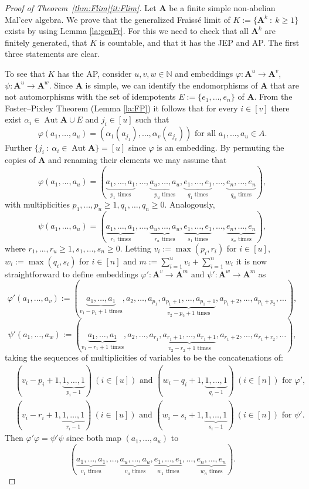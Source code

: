 \documentclass[12pt,a4paper,reqno]{amsart}
\numberwithin{equation}{section}
\theoremstyle{plain}
\theoremstyle{definition}
\newcommand{\A}{\mathbf{A}}
\newcommand{\N}{\mathbb{N}}
\DeclareMathOperator{\Aut}{Aut}
\newcommand{\st}{\: :\:}
\begin{document}
\begin{proof}[Proof of Theorem~\ref{thm:Flim}\eqref{it:Flim}]
 Let $\A$ be a finite simple non-abelian Mal'cev algebra. 
We prove that the generalized Fra{\"i}ss{\'e} limit of $K := \{\mathbf{A}^k \st {k\geq 1}\}$ exists by using 
Lemma \ref{la:genFr}. For this we need to check that all $\A^k$ are finitely generated, 
that $K$ is countable, and that it has the JEP and AP. The first three statements are clear.

 To see that $K$ has the AP, consider $u,v,w\in\N$ and embeddings $\varphi\colon \A^u\to\A^v$, $\psi\colon \A^u\to\A^w$.
 Since $\A$ is simple, we can identify the endomorphisms of $\A$ that are not automorphisms with the set of idempotents
 $E := \{e_1,\dots,e_n\}$ of $\A$. 
 From the Foster--Pixley Theorem (Lemma \ref{la:FP}) it follows that for every $i\in [v]$ there exist
 $\alpha_i\in\Aut\A \cup E$ and $j_i\in [u]$ such that
\[ \varphi(a_1,\dots,a_u) = (\alpha_1(a_{j_1}),\dots,\alpha_v(a_{j_v})) \text{ for all } a_1,\dots,a_u\in A. \]
 Further $\{j_i\st \alpha_i\in\Aut\A\} = [u]$ since $\varphi$ is an embedding.
By permuting the copies of $\A$ and renaming their elements we may assume that
\[ \varphi(a_1,\dots,a_u) = (\underbrace{a_1,\dots,a_1}_{p_1 \text{ times}},\dots,\underbrace{a_u,\dots,a_u}_{p_u \text{ times}},\underbrace{e_1,\dots,e_1}_{q_1 \text{ times}},\dots,\underbrace{e_n,\dots,e_n}_{q_n \text{ times}}), \]
 with multiplicities $p_1,\dots,p_u\geq 1, q_1,\dots,q_n\geq 0$.
Analogously,
\[ \psi(a_1,\dots,a_u) = (\underbrace{a_1,\dots,a_1}_{r_1 \text{ times}},\dots,\underbrace{a_u,\dots,a_u}_{r_u \text{ times}},\underbrace{e_1,\dots,e_1}_{s_1 \text{ times}},\dots,\underbrace{e_n,\dots,e_n}_{s_n \text{ times}}), \]
 where $r_1,\dots,r_u\geq 1, s_1,\dots,s_n\geq 0$. 
Letting
 $v_i:=\max(p_i,r_i)$ for $i\in [u]$, $w_i:= \max(q_i,s_i)$ for $i\in [n]$ and
 $m := \sum_{i=1}^u v_i+ \sum_{i=1}^n w_i$ it is now straightforward to define embeddings $\varphi'\colon\A^v\to\A^m$
 and $\psi'\colon\A^w\to\A^m$ as 
 \[ \varphi'(a_1,\dots,a_v) := (\underbrace{a_1,\dots,a_1}_{v_1-p_1+1 \text{ times}},a_2,\dots,a_{p_1},\underbrace{a_{p_1+1},\dots,a_{p_1+1}}_{v_2-p_2+1 \text{ times}},a_{p_1+2},\dots,a_{p_1+p_2},\dots), \]
 \[ \psi'(a_1,\dots,a_w) := (\underbrace{a_1,\dots,a_1}_{v_1-r_1+1 \text{ times}},a_2,\dots,a_{r_1},\underbrace{a_{r_1+1},\dots,a_{r_1+1}}_{v_2-r_2+1 \text{ times}},a_{r_1+2},\dots,a_{r_1+r_2},\dots), \]
 taking  the sequences of multiplicities of variables to be the concatenations of:
 \begin{align*}
 &(v_i-p_i+1,\underbrace{1,\dots,1}_{p_i-1})\ (i\in [u])\text{ and }
 (w_i-q_i+1,\underbrace{1,\dots,1}_{q_i-1})\ (i\in [n]) \text{ for } \varphi',\\
 &(v_i-r_i+1,\underbrace{1,\dots,1}_{r_i-1})\ (i\in [u])\text{ and }
 (w_i-s_i+1,\underbrace{1,\dots,1}_{s_i-1})\ (i\in [n]) \text{ for } \psi'.
 \end{align*}
 Then $\varphi'\varphi=\psi'\psi$ since both map $(a_1,\dots,a_u)$ to
\[  (\underbrace{a_1,\dots,a_1}_{v_1 \text{ times}},\dots,\underbrace{a_u,\dots,a_u}_{v_u \text{ times}},\underbrace{e_1,\dots,e_1}_{w_1 \text{ times}},\dots,\underbrace{e_n,\dots,e_n}_{w_n \text{ times}}). \]


\end{proof}
\end{document}
